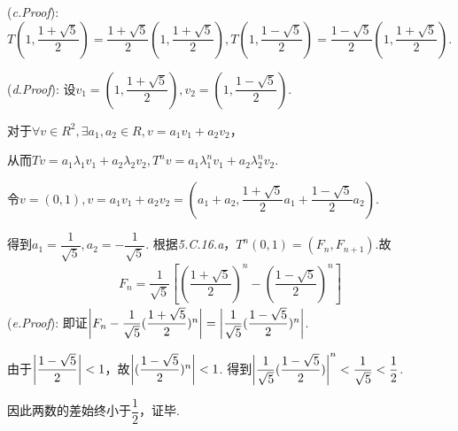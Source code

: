 (\textit{c.Proof}):
$T(1,\dfrac{1+\sqrt{5}}{2})=\dfrac{1+\sqrt{5}}{2}(1,\dfrac{1+\sqrt{5}}{2}),
T(1,\dfrac{1-\sqrt{5}}{2})=\dfrac{1-\sqrt{5}}{2}(1,\dfrac{1+\sqrt{5}}{2})$.

(\textit{d.Proof}):
设\(v_1=(1,\dfrac{1+\sqrt{5}}{2}),v_2=(1,\dfrac{1-\sqrt{5}}{2})\).

对于\(\forall v \in R^2,\exists a_1,a_2 \in R,v=a_1v_1+a_2v_2\)，

从而\(Tv=a_1\lambda_1 v_1+a_2\lambda_2 v_2,T^n v=a_1\lambda_1^n v_1+a_2\lambda_2^n v_2\).

令\(v=(0,1),v=a_1v_1+a_2v_2=(a_1+a_2,\dfrac{1+\sqrt{5}}{2}a_1+\dfrac{1-\sqrt{5}}{2}a_2)\).

得到\(a_1=\dfrac{1}{\sqrt{5}},a_2=-\dfrac{1}{\sqrt{5}}\).
根据\textit{5.C.16.a}，\(T^n(0,1)=(F_n,F_{n+1})\).故
    \begin{align*}
        F_n=\dfrac{1}{\sqrt{5}}[(\dfrac{1+\sqrt{5}}{2})^n-(\dfrac{1-\sqrt{5}}{2})^n]
    \end{align*}
(\textit{e.Proof}):
即证\(\left\lvert F_n-\dfrac{1}{\sqrt{5}}(\dfrac{1+\sqrt{5}}{2})^n \right\rvert=\left\lvert \dfrac{1}{\sqrt{5}}(\dfrac{1-\sqrt{5}}{2})^n \right\rvert\).

由于\(\left\lvert \dfrac{1-\sqrt{5}}{2} \right\rvert<1\)，故\(\left\lvert (\dfrac{1-\sqrt{5}}{2})^n \right\rvert<1\).
得到\(\left\lvert \dfrac{1}{\sqrt{5}}(\dfrac{1-\sqrt{5}}{2}) \right\rvert^n<\dfrac{1}{\sqrt{5}}<\dfrac{1}{2}\).

因此两数的差始终小于\(\dfrac{1}{2}\)，证毕.

